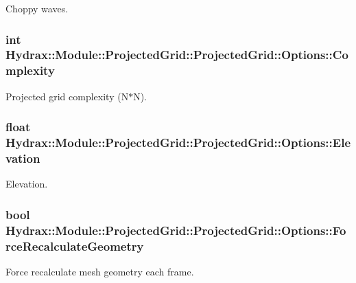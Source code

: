 Choppy waves. 

\hypertarget{struct_hydrax_1_1_module_1_1_projected_grid_1_1_options_155754beb2d89d3747e930b1705d3e66}{
\subsubsection[{Complexity}]{\setlength{\rightskip}{0pt plus 5cm}int Hydrax::Module::ProjectedGrid::ProjectedGrid::Options::Complexity}}
\label{struct_hydrax_1_1_module_1_1_projected_grid_1_1_options_155754beb2d89d3747e930b1705d3e66}


Projected grid complexity (N$\ast$N). 

\hypertarget{struct_hydrax_1_1_module_1_1_projected_grid_1_1_options_da25050d6816620f94ca25cc01ef4c5d}{
\subsubsection[{Elevation}]{\setlength{\rightskip}{0pt plus 5cm}float Hydrax::Module::ProjectedGrid::ProjectedGrid::Options::Elevation}}
\label{struct_hydrax_1_1_module_1_1_projected_grid_1_1_options_da25050d6816620f94ca25cc01ef4c5d}


Elevation. 

\hypertarget{struct_hydrax_1_1_module_1_1_projected_grid_1_1_options_5a46c5be302d10a9c0886ccbe18cab40}{
\subsubsection[{ForceRecalculateGeometry}]{\setlength{\rightskip}{0pt plus 5cm}bool Hydrax::Module::ProjectedGrid::ProjectedGrid::Options::ForceRecalculateGeometry}}
\label{struct_hydrax_1_1_module_1_1_projected_grid_1_1_options_5a46c5be302d10a9c0886ccbe18cab40}


Force recalculate mesh geometry each frame. 

